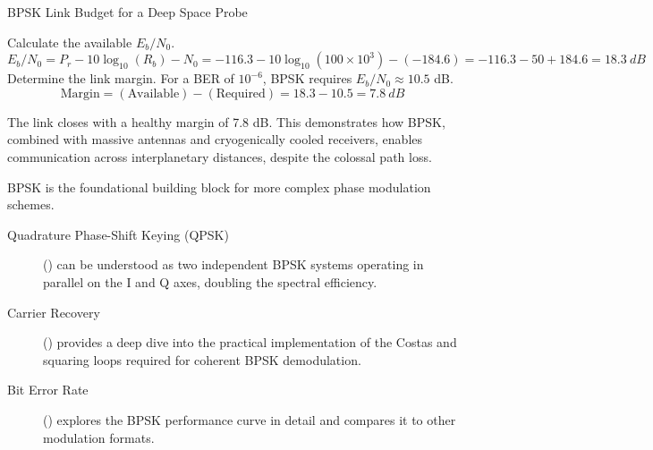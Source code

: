 \begin{workedexample}{BPSK Link Budget for a Deep Space Probe}
\begin{derivationsteps}
        \step Calculate the available $E_b/N_0$.
        \[ E_b/N_0 = P_r - 10\log_{10}(R_b) - N_0 = -116.3 - 10\log_{10}(100 \times 10^3) - (-184.6) = -116.3 - 50 + 184.6 = \qty{18.3}{dB} \]
        \step Determine the link margin. For a BER of $10^{-6}$, BPSK requires $E_b/N_0 \approx 10.5$ dB.
        \[ \text{Margin} = (\text{Available}) - (\text{Required}) = 18.3 - 10.5 = \qty{7.8}{dB} \]
    \end{derivationsteps}
     The link closes with a healthy margin of 7.8 dB. This demonstrates how BPSK, combined with massive antennas and cryogenically cooled receivers, enables communication across interplanetary distances, despite the colossal path loss.
\end{workedexample}


\begin{importantbox}[title={Further Reading}]
    BPSK is the foundational building block for more complex phase modulation schemes.
    \begin{description}
        \item[Quadrature Phase-Shift Keying (QPSK)] () can be understood as two independent BPSK systems operating in parallel on the I and Q axes, doubling the spectral efficiency.
        \item[Carrier Recovery] () provides a deep dive into the practical implementation of the Costas and squaring loops required for coherent BPSK demodulation.
        \item[Bit Error Rate] () explores the BPSK performance curve in detail and compares it to other modulation formats.
    \end{description}
\end{importantbox}